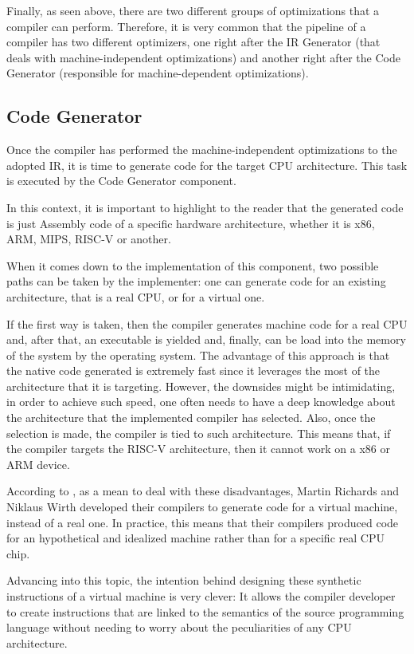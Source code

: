 Finally, as seen above, there are two different groups of optimizations that a compiler can perform. Therefore, it is very common that the pipeline of a compiler has two different optimizers, one right after the IR Generator (that deals with machine-independent optimizations) and another right after the Code Generator (responsible for machine-dependent optimizations).

\subsection{Code Generator}
Once the compiler has performed the machine-independent optimizations to the adopted IR, it is time to generate code for the target CPU architecture. This task is executed by the Code Generator component.

In this context, it is important to highlight to the reader that the generated code is just Assembly code of a specific hardware architecture, whether it is x86, ARM, MIPS, RISC-V or another.

When it comes down to the implementation of this component, two possible paths can be taken by the implementer: one can generate code for an existing architecture, that is a real CPU, or for a virtual one.

If the first way is taken, then the compiler generates machine code for a real CPU and, after that, an executable is yielded and, finally, can be load into the memory of the system by the operating system. The advantage of this approach is that the native code generated is extremely fast since it leverages the most of the architecture that it is targeting. However, the downsides might be intimidating, in order to achieve such speed, one often needs to have a deep knowledge about the architecture that the implemented compiler has selected. Also, once the selection is made, the compiler is tied to such architecture. This means that, if the compiler targets the RISC-V architecture, then it cannot work on a x86 or ARM device.

According to \cite{nystrom2021crafting}, as a mean to deal with these disadvantages, Martin Richards and Niklaus Wirth developed their compilers to generate code for a virtual machine, instead of a real one. In practice, this means that their compilers produced code for an hypothetical and idealized machine rather than for a specific real CPU chip.

Advancing into this topic, the intention behind designing these synthetic instructions of a virtual machine is very clever: It allows the compiler developer to create instructions that are linked to the semantics of the source programming language without needing to worry about the peculiarities of any CPU architecture.


